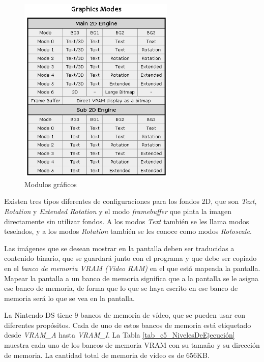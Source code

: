 \begin{figure}[t]
	\centering
	\includegraphics[height=9cm]{Figuras/C5/c5_modos-graficos.png}
	\caption{Modulos gráficos}
	\label{fig_c5_modulos}
\end{figure}

Existen tres tipos diferentes de configuraciones para los fondos 2D, que son \textit{Text}, \textit{Rotation} y \textit{Extended Rotation} y el modo \textit{framebuffer} que pinta la imagen directamente sin utilizar fondos. A los modos \textit{Text} también se les llama modos teselados, y a los modos \textit{Rotation} también se les conoce como modos \textit{Rotoscale}.

Las imágenes que se desean mostrar en la pantalla deben ser traducidas a contenido binario, que se guardará junto con el programa y que debe ser copiado en el \textit{banco de memoria VRAM (Video RAM)} en el que está mapeada la pantalla. Mapear la pantalla a un banco de memoria significa que a la pantalla se le asigna ese banco de memoria, de forma que lo que se haya escrito en ese banco de memoria será lo que se vea en la pantalla. 

La Nintendo DS tiene 9 bancos de memoria de vídeo, que se pueden usar con diferentes propósitos. Cada de uno de estos bancos de memoria está etiquetado desde \textit{VRAM\_A} hasta \textit{VRAM\_I}. La Tabla \ref{tab_c5_NivelesDeEjecución} muestra cada uno de los bancos de memoria VRAM con su tamaño y su dirección de memoria. La cantidad total de memoria de vídeo es de 656KB. 

